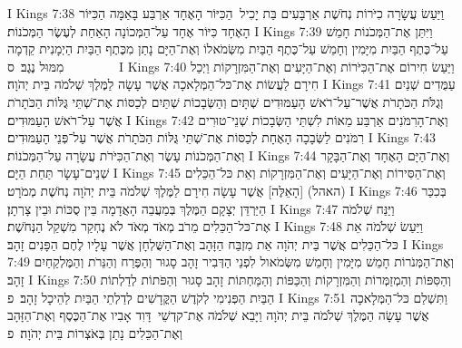 I Kings 7:38	וַיַּעַשׂ עֲשָׂרָה כִיֹּרוֹת נְחֹשֶׁת אַרְבָּעִים בַּת יָכִיל  הַכִּיּוֹר הָאֶחָד אַרְבַּע בָּאַמָּה הַכִּיּוֹר הָאֶחָד כִּיּוֹר אֶחָד עַל־הַמְּכוֹנָה הָאַחַת לְעֶשֶׂר הַמְּכֹנוֹת׃
I Kings 7:39	וַיִּתֵּן אֶת־הַמְּכֹנוֹת חָמֵשׁ עַל־כֶּתֶף הַבַּיִת מִיָּמִין וְחָמֵשׁ עַל־כֶּתֶף הַבַּיִת מִשְּׂמֹאלוֹ וְאֶת־הַיָּם נָתַן מִכֶּתֶף הַבַּיִת הַיְמָנִית קֵדְמָה מִמּוּל נֶגֶב׃ {ס}        
I Kings 7:40	וַיַּעַשׂ חִירוֹם אֶת־הַכִּיֹּרוֹת וְאֶת־הַיָּעִים וְאֶת־הַמִּזְרָקוֹת וַיְכַל חִירָם לַעֲשׂוֹת אֶת־כּל־הַמְּלָאכָה אֲשֶׁר עָשָׂה לַמֶּלֶךְ שְׁלֹמֹה בֵּית יְהֹוָה׃
I Kings 7:41	עַמֻּדִים שְׁנַיִם וְגֻלֹּת הַכֹּתָרֹת אֲשֶׁר־עַל־רֹאשׁ הָעַמּוּדִים שְׁתָּיִם וְהַשְּׂבָכוֹת שְׁתַּיִם לְכַסּוֹת אֶת־שְׁתֵּי גֻּלּוֹת הַכֹּתָרֹת אֲשֶׁר עַל־רֹאשׁ הָעַמּוּדִים׃
I Kings 7:42	וְאֶת־הָרִמֹּנִים אַרְבַּע מֵאוֹת לִשְׁתֵּי הַשְּׂבָכוֹת שְׁנֵי־טוּרִים רִמֹּנִים לַשְּׂבָכָה הָאֶחָת לְכַסּוֹת אֶת־שְׁתֵּי גֻּלּוֹת הַכֹּתָרֹת אֲשֶׁר עַל־פְּנֵי הָעַמּוּדִים׃
I Kings 7:43	וְאֶת־הַמְּכֹנוֹת עָשֶׂר וְאֶת־הַכִּיֹּרֹת עֲשָׂרָה עַל־הַמְּכֹנוֹת׃
I Kings 7:44	וְאֶת־הַיָּם הָאֶחָד וְאֶת־הַבָּקָר שְׁנֵים־עָשָׂר תַּחַת הַיָּם׃
I Kings 7:45	וְאֶת־הַסִּירוֹת וְאֶת־הַיָּעִים וְאֶת־הַמִּזְרָקוֹת וְאֵת כּל־הַכֵּלִים (האהל) [הָאֵלֶּה] אֲשֶׁר עָשָׂה חִירָם לַמֶּלֶךְ שְׁלֹמֹה בֵּית יְהֹוָה נְחֹשֶׁת מְמֹרָט׃
I Kings 7:46	בְּכִכַּר הַיַּרְדֵּן יְצָקָם הַמֶּלֶךְ בְּמַעֲבֵה הָאֲדָמָה בֵּין סֻכּוֹת וּבֵין צָרְתָן׃
I Kings 7:47	וַיַּנַּח שְׁלֹמֹה אֶת־כּל־הַכֵּלִים מֵרֹב מְאֹד מְאֹד לֹא נֶחְקַר מִשְׁקַל הַנְּחֹשֶׁת׃
I Kings 7:48	וַיַּעַשׂ שְׁלֹמֹה אֵת כּל־הַכֵּלִים אֲשֶׁר בֵּית יְהֹוָה אֵת מִזְבַּח הַזָּהָב וְאֶת־הַשֻּׁלְחָן אֲשֶׁר עָלָיו לֶחֶם הַפָּנִים זָהָב׃
I Kings 7:49	וְאֶת־הַמְּנֹרוֹת חָמֵשׁ מִיָּמִין וְחָמֵשׁ מִשְּׂמֹאול לִפְנֵי הַדְּבִיר זָהָב סָגוּר וְהַפֶּרַח וְהַנֵּרֹת וְהַמֶּלְקַחַיִם זָהָב׃
I Kings 7:50	וְהַסִּפּוֹת וְהַמְזַמְּרוֹת וְהַמִּזְרָקוֹת וְהַכַּפּוֹת וְהַמַּחְתּוֹת זָהָב סָגוּר וְהַפֹּתוֹת לְדַלְתוֹת הַבַּיִת הַפְּנִימִי לְקֹדֶשׁ הַקֳּדָשִׁים לְדַלְתֵי הַבַּיִת לַהֵיכָל זָהָב׃ {פ}
I Kings 7:51	וַתִּשְׁלַם כּל־הַמְּלָאכָה אֲשֶׁר עָשָׂה הַמֶּלֶךְ שְׁלֹמֹה בֵּית יְהֹוָה וַיָּבֵא שְׁלֹמֹה אֶת־קדְשֵׁי  דָּוִד אָבִיו אֶת־הַכֶּסֶף וְאֶת־הַזָּהָב וְאֶת־הַכֵּלִים נָתַן בְּאֹצְרוֹת בֵּית יְהֹוָה׃ {פ}

